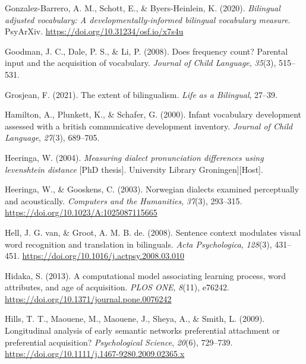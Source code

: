 \documentclass[
  man,
  floatsintext,
  colorlinks=true,linkcolor=blue,citecolor=blue,urlcolor=blue,biblatex]{apa7}
\newlength{\cslhangindent}
\newlength{\cslentryspacingunit} %
\newenvironment{CSLReferences}[2] %
 {%
  \setlength{\parindent}{0pt}
  \ifodd #1
  \let\oldpar\par
  \def\par{\hangindent=\cslhangindent\oldpar}
  \fi
  \setlength{\parskip}{#2\cslentryspacingunit}
 }%
 {}
\begin{document}
\begin{CSLReferences}{1}{0}
\leavevmode{}%
Gonzalez-Barrero, A. M., Schott, E., \& Byers-Heinlein, K. (2020).
\emph{Bilingual adjusted vocabulary: A developmentally-informed
bilingual vocabulary measure}. {PsyArXiv}.
\url{https://doi.org/10.31234/osf.io/x7s4u}

\leavevmode{}%
Goodman, J. C., Dale, P. S., \& Li, P. (2008). Does frequency count?
Parental input and the acquisition of vocabulary. \emph{Journal of Child
Language}, \emph{35}(3), 515--531.

\leavevmode{}%
Grosjean, F. (2021). The extent of bilingualism. \emph{Life as a
Bilingual}, 27--39.

\leavevmode{}%
Hamilton, A., Plunkett, K., \& Schafer, G. (2000). Infant vocabulary
development assessed with a british communicative development inventory.
\emph{Journal of Child Language}, \emph{27}(3), 689--705.

\leavevmode{}%
Heeringa, W. (2004). \emph{Measuring dialect pronunciation differences
using levenshtein distance} {[}PhD thesis{]}. University Library
Groningen{]}{[}Host{]}.

\leavevmode{}%
Heeringa, W., \& Gooskens, C. (2003). Norwegian dialects examined
perceptually and acoustically. \emph{Computers and the Humanities},
\emph{37}(3), 293--315. \url{https://doi.org/10.1023/A:1025087115665}

\leavevmode{}%
Hell, J. G. van, \& Groot, A. M. B. de. (2008). Sentence context
modulates visual word recognition and translation in bilinguals.
\emph{Acta Psychologica}, \emph{128}(3), 431--451.
\url{https://doi.org/10.1016/j.actpsy.2008.03.010}

\leavevmode{}%
Hidaka, S. (2013). A computational model associating learning process,
word attributes, and age of acquisition. \emph{{PLOS} {ONE}},
\emph{8}(11), e76242. \url{https://doi.org/10.1371/journal.pone.0076242}

\leavevmode{}%
Hills, T. T., Maouene, M., Maouene, J., Sheya, A., \& Smith, L. (2009).
Longitudinal analysis of early semantic networks preferential attachment
or preferential acquisition? \emph{Psychological Science}, \emph{20}(6),
729--739. \url{https://doi.org/10.1111/j.1467-9280.2009.02365.x}


\end{CSLReferences}
\end{document}
